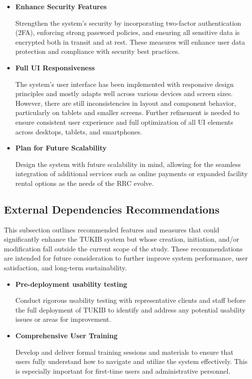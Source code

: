 \begin{itemize}
	\item \textbf{Enhance Security Features}
	
	Strengthen the system’s security by incorporating two-factor authentication (2FA), enforcing strong password policies, and ensuring all sensitive data is encrypted both in transit and at rest. These measures will enhance user data protection and compliance with security best practices.
	
	\item \textbf{Full UI Responsiveness}
	
	The system’s user interface has been implemented with responsive design principles and mostly adapts well across various devices and screen sizes. However, there are still inconsistencies in layout and component behavior, particularly on tablets and smaller screens. Further refinement is needed to ensure consistent user experience and full optimization of all UI elements across desktops, tablets, and smartphones.
	
	\item \textbf{Plan for Future Scalability}
	
	Design the system with future scalability in mind, allowing for the seamless integration of additional services such as online payments or expanded facility rental options as the needs of the RRC evolve.
	
\end{itemize}

\subsection{External Dependencies Recommendations}

This subsection outlines recommended features and measures that could significantly enhance the TUKIB system but whose creation, initiation, and/or modification fall outside the current scope of the study. These recommendations are intended for future consideration to further improve system performance, user satisfaction, and long-term sustainability.

\begin{itemize}
	
	\item \textbf{Pre-deployment usability testing}
	
	Conduct rigorous usability testing with representative clients and staff before the full deployment of TUKIB to identify and address any potential usability issues or areas for improvement.
	
	\item \textbf{Comprehensive User Training}
	
	Develop and deliver formal training sessions and materials to ensure that users fully understand how to navigate and utilize the system effectively. This is especially important for first-time users and administrative personnel.
	
\end{itemize}


